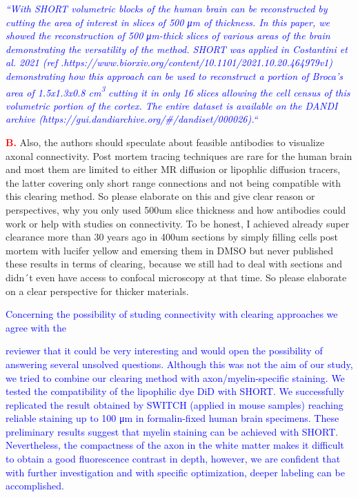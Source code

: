 \documentclass{article}
\newcommand{\reply}[1]{\textcolor{blue}{#1}}
\newcommand{\redmark}[1]{\textcolor{red}{#1}}
\begin{document}
\noindent \reply{\emph{“With SHORT volumetric blocks of the human brain can be reconstructed by cutting the area of}} \reply{\emph{interest in slices of 500 μm of thickness. In this paper, we showed the reconstruction of 500 μm-}}\reply{\emph{thick slices of various areas of the brain demonstrating the versatility of the method. SHORT was}} \reply{\emph{applied in Costantini et al. 2021 (ref}} \reply{\emph{.https://www.biorxiv.org/content/10.1101/2021.10.20.464979v1) demonstrating how this approach}} \reply{\emph{can be used to reconstruct a portion of Broca’s area of 1.5x1.3x0.8 cm}}\reply{\emph{\textsuperscript{3}}} \reply{\emph{cutting it in only 16 slices}} \reply{\emph{allowing the cell census of this volumetric portion of the cortex. The entire dataset is available on}} \reply{\emph{the DANDI archive (https://gui.dandiarchive.org/\#/dandiset/000026).“}}

\noindent \redmark{\textbf{B.}} Also, the authors should speculate about feasible antibodies to visualize axonal connectivity. Post mortem tracing techniques are rare for the human brain and most them are limited to either MR diffusion or lipophlic diffusion tracers, the latter covering only short range connections and not being compatible with this clearing method. So please elaborate on this and give clear reason or perspectives, why you only used 500um slice thickness and how antibodies could work or help with studies on connectivity. To be honest, I achieved already super clearance more than 30 years ago in 400um sections by simply filling cells post mortem with lucifer yellow and emersing them in DMSO but never published these results in terms of clearing, because we still had to deal with sections and didn´t even have access to confocal microscopy at that time. So please elaborate on a clear perspective for thicker materials.

\noindent \reply{Concerning the possibility of studing connectivity with clearing approaches we agree with the}

\noindent {}\reply{reviewer that it could be very interesting and would open the possibility of answering several} \reply{unsolved questions. Although this was not the aim of our study, we tried to combine our clearing} \reply{method with axon/myelin-specific staining. We tested the compatibility of the lipophilic dye DiD with} \reply{SHORT. We successfully replicated the result obtained by SWITCH (applied in mouse samples)} \reply{reaching reliable staining up to 100 μm in formalin-fixed human brain specimens. These} \reply{preliminary results suggest that myelin staining can be achieved with SHORT. Nevertheless, the} \reply{compactness of the axon in the white matter makes it difficult to obtain a good fluorescence} \reply{contrast in depth, however, we are confident that with further investigation and with specific} \reply{optimization, deeper labeling can be accomplished.}
\end{document}
